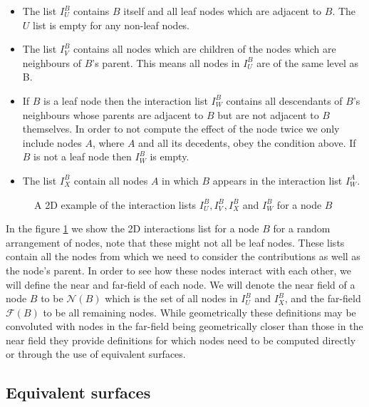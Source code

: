 \begin{itemize}
\item The list $I^B_U$ contains $B$ itself and all leaf nodes which are adjacent to $B$. The $U$ list is empty for any non-leaf nodes.

\item The list $I_V^B$ contains all nodes which are children of the nodes which are neighbours of $B$'s parent. This means all nodes in $I_U^B$ are of the same level as B.

\item If $B$ is a leaf node then the interaction list $I_W^B$ contains all descendants of $B$'s neighbours whose parents are adjacent to $B$ but are not adjacent to $B$ themselves. In order to not compute the effect of the node twice we only include nodes $A$, where $A$ and all its decedents, obey the condition above. If $B$ is not a leaf node then $I_W^B$ is empty.

\item The list $I_X^B$ contain all nodes $A$ in which $B$ appears in the interaction list $I_W^A$.
\end{itemize}

\begin{figure}[ht]
    \centering
    \resizebox{.3\linewidth}{!}{}
    \caption{A 2D example of the interaction lists $I_U^B, I_V^B, I_X^B$ and $I_W^B$ for a node $B$}
    \label{fig:InteractionsLists}
\end{figure}


In the figure \ref{fig:InteractionsLists} we show the 2D interactions list for a node $B$ for a random arrangement of nodes, note that these might not all be leaf nodes. These lists contain all the nodes from which we need to consider the contributions as well as the node's parent. In order to see how these nodes interact with each other, we will define the near and far-field of each node. We will denote the near field of a node $B$ to be $\mathcal{N}(B)$ which is the set of all nodes in $I_U^B$ and $I_X^B$, and the far-field $\mathcal{F}(B)$ to be all remaining nodes. While geometrically these definitions may be convoluted with nodes in the far-field being geometrically closer than those in the near field they provide definitions for which nodes need to be computed directly or through the use of equivalent surfaces.

\subsection{Equivalent surfaces}

